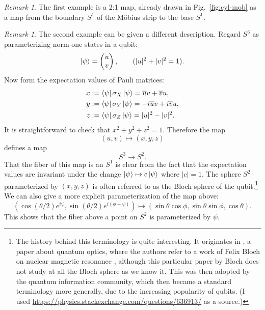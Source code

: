 \documentclass[12pt]{article}
\numberwithin{equation}{section}
\numberwithin{figure}{section}
\theoremstyle{remark}
\newtheorem{remark}[definition]{Remark}
\let\bar\overline
\begin{document}
\begin{remark}
The first example is a 2:1 map,
already drawn in Fig.~\ref{fig:cyl-mob} 
as a map from the boundary $S^1$ of the M\"obius strip to the base $S^1$.
\end{remark}
\begin{remark}
The second example can be given a different description. 
Regard $S^3$ as parameterizing norm-one states
in a qubit:
\begin{equation}
  \ket{\psi}=\begin{pmatrix}u \\v \end{pmatrix},
  \qquad (|u|^2+|v|^2=1).
\end{equation}
Now form the expectation values of Pauli matrices:
\begin{align}
  x &:= \bra{\psi} \sigma_X \ket{\psi} = \bar u v + \bar v u, \\
  y &:= \bra{\psi} \sigma_Y \ket{\psi} = -i\bar u v +i \bar v u, \\
  z &:= \bra{\psi} \sigma_Z \ket{\psi} = |u|^2 - |v|^2.
\end{align}
It is straightforward to check that $x^2+y^2+z^2=1$.
Therefore the map \begin{equation}
(u,v)\mapsto (x,y,z)
\label{eq:uvXYZ}
\end{equation} defines a map \begin{equation}
  S^3\to S^2.
\end{equation}
That the fiber of this map is an $S^1$ is clear from the fact
that the expectation values are invariant under the change
$\ket{\psi}\mapsto c\ket{\psi}$ where $|c|=1$.
The sphere $S^2$ parameterized by $(x,y,z)$ is often referred to as the Bloch sphere of the qubit.\footnote{%
The history behind this terminology is quite interesting.
It originates in \cite{ACGT}, a paper about quantum optics,
where the authors refer to a work of Felix Bloch on nuclear magnetic resonance \cite{Bloch}, 
although this particular paper by Bloch does not study at all the Bloch sphere as we know it.
This was then adopted by the quantum information community,
which then became a standard terminology more generally, due to the increasing popularity of qubits. 
(I used \url{https://physics.stackexchange.com/questions/636913/} as a source.)
}
We can also give a more explicit parameterization of the map above:
\begin{equation}
  \label{eq:Hopf-explicit}
(\cos(\theta/2)  e^{i \psi},
\sin(\theta/2) e^{i(\phi+\psi)} )
\mapsto  (\sin\theta\cos\phi,\sin\theta\sin\phi,\cos\theta).
\end{equation}
This shows that the fiber above a point on $S^2$ is parameterized by $\psi$.


\end{remark}
\end{document}
